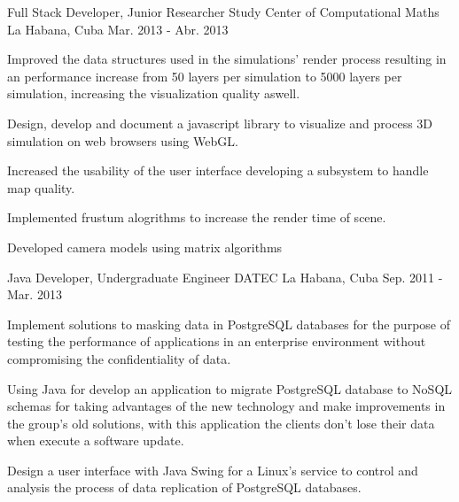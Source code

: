 \begin{cventries}
\cventry
{Full Stack Developer, Junior Researcher} %
{Study Center of Computational Maths} %
{La Habana, Cuba} %
{Mar. 2013 - Abr. 2013} %
{ %
\begin{cvitems}
\item {Improved the data structures used in the simulations' render process resulting in an
performance increase from 50 layers per simulation to 5000 layers per simulation, increasing the visualization quality aswell.}
\item {Design, develop and document a javascript library to visualize and process 3D simulation on web browsers
using WebGL.}
\item {Increased the usability of the user interface developing a subsystem to handle map quality.}
\item {Implemented frustum alogrithms to increase the render time of scene.}
\item {Developed camera models using matrix algorithms}
\end{cvitems}
}


\cventry
{Java Developer, Undergraduate Engineer} %
{DATEC} %
{La Habana, Cuba} %
{Sep. 2011 - Mar. 2013} %
{ %
\begin{cvitems}
\item {Implement solutions to masking data in PostgreSQL databases for the purpose of testing the performance of applications in an enterprise environment without compromising the confidentiality of data.}
\item {Using Java for develop an application to migrate PostgreSQL database to NoSQL schemas for taking advantages of the new technology and make improvements in the group's old solutions, with this application the clients don't lose their data when execute a software update.}
\item {Design a user interface with Java Swing for a Linux's service to control and analysis the process of data replication of PostgreSQL databases.}
\end{cvitems} 
}
\end{cventries}